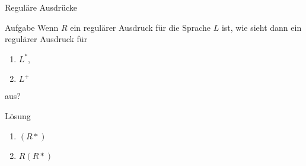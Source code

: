 \begin{frame}{Reguläre Ausdrücke}
\begin{exampleblock}{Aufgabe}
	Wenn $R$ ein regulärer Ausdruck für die Sprache $L$ ist, wie sieht dann ein regulärer Ausdruck für
	\begin{enumerate}
		\item $L^*$,
		\item $L^+$
	\end{enumerate}
	aus?
\end{exampleblock}
\pause
\begin{block}{Lösung}
	\begin{enumerate}
		\item $(R*)$
		\item $R(R*)$
	\end{enumerate}
\end{block}
\end{frame}